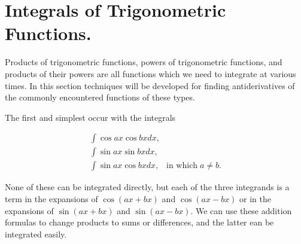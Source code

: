 \section{Integrals of Trigonometric Functions.}
Products of trigonometric functions, powers of trigonometric functions, 
and products of their powers are all functions which we need to integrate 
at various times. In this section techniques will be developed for finding
antiderivatives of the commonly encountered functions of these types.

The first and simplest occur with the integrals

\begin{equation}
\begin{array}{l}
\int \cos ax \cos bx dx, \\
\int \sin ax \sin bx dx,  \\
\int \sin ax \cos bx dx, \;\;\;\mbox{in which}\; a \neq b.
\end{array}
\label{eq7.2.1}
\end{equation}

\noindent None of these can be integrated directly, but eaeh of the three integrands is a term in the expansions of $\cos(ax + bx)$ and $\cos(ax - bx)$ or in the expansions of $\sin(ax + bx)$ and $\sin(ax - bx)$. We can use these addition formulas to change products to sums or differences, and the latter ean be integrated easily. 

